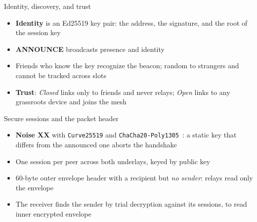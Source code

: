 \begin{frame}{Identity, discovery, and trust}
    \centering
    \vspace{1ex}
    \begin{itemize}
        \item \textbf{Identity} is an Ed25519 key pair: the address, the signature, and the root of the session key
        \item \textbf{ANNOUNCE} broadcasts presence and identity
        \item Friends who know the key recognize the beacon; random to strangers and cannot be tracked across slots
        \item \textbf{Trust}: \emph{Closed} links only to friends and never relays; \emph{Open} links to any grassroots device and joins the mesh
    \end{itemize}
\end{frame}

\begin{frame}{Secure sessions and the packet header}
    \begin{itemize}
        \item \textbf{Noise XX} with \texttt{Curve25519} and \texttt{ChaCha20-Poly1305}~\cite{Kobeissi2018, polychacha}: a static key that differs from the announced one aborts the handshake
        \item One session per peer across both underlays, keyed by public key
        \item 60-byte outer envelope header with a recipient but \emph{no sender}: relays read only the \mbox{envelope}
        \item The receiver finds the sender by trial decryption against its sessions, to read inner encrypted envelope
    \end{itemize}
\end{frame}

